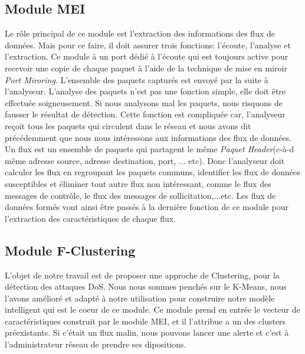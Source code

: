 \newpage
\subsection{Module MEI}
Le rôle principal de ce module est l'extraction des informations des flux de données. Mais pour ce faire, il doit assurer trois fonctions: l'écoute, l'analyse et l'extraction. Ce module à un port dédié à l'écoute qui est toujours active pour recevoir une copie de chaque paquet à l'aide de la technique de mise en miroir \textit{Port Miroring}. L'ensemble des paquets capturés est envoyé par la suite à l'analyseur. L'analyse des paquets n'est pas une fonction simple, elle doit être effectuée soigneusement. Si nous analysons mal les paquets, nous risquons de fausser le résultat de détection. Cette fonction est compliquée car, l'analyseur reçoit tous les paquets qui circulent dans le réseau et nous avons dit précédemment que nous nous intéressons aux informations des flux de données. Un flux est un ensemble de paquets qui partagent le même \textit{Paquet Header}(c-à-d même adresse source, adresse destination, port, ... etc). Donc l'analyseur doit calculer les flux en regroupant les paquets communs, identifier les flux de données susceptibles et éliminer tout autre flux non intéressant, comme le flux des messages de contrôle, le flux des messages de sollicitation,...etc. Les flux de données formés vont ainsi être passés à la dernière fonction de ce module pour l'extraction des caractéristiques de chaque flux.

\newpage
\subsection{Module F-Clustering}
L'objet de notre travail est de proposer une approche de Clustering, pour la détection des attaques DoS. Nous nous sommes penchés sur le K-Means, nous l'avons amélioré et adapté à notre utilisation pour construire notre modèle intelligent qui est le coeur de ce module. Ce module prend en entrée le vecteur de caractéristiques construit par le module MEI,  et il l'attribue a un des clusters préexistants. Si c'était un flux malin, nous pouvons lancer une alerte et c'est à l'administrateur réseau de prendre ses dipositions.

